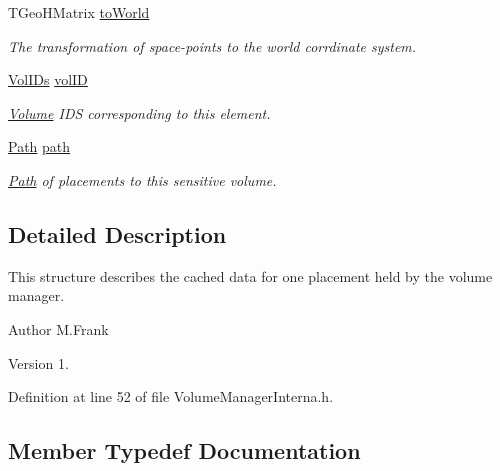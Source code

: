 \begin{DoxyCompactItemize}
T\+Geo\+H\+Matrix \hyperlink{class_d_d4hep_1_1_geometry_1_1_volume_manager_context_a724f7f6ffc6fc9e91dca0f07d5f14d1d}{to\+World}
\begin{DoxyCompactList}\small\item\em The transformation of space-\/points to the world corrdinate system. \end{DoxyCompactList}\item 
\hyperlink{class_d_d4hep_1_1_geometry_1_1_volume_manager_context_aedf28d4a226428cfc6ebaabaee0b4c9e}{Vol\+I\+Ds} \hyperlink{class_d_d4hep_1_1_geometry_1_1_volume_manager_context_a3982d4e94fc483caa54382e719eb568c}{vol\+ID}
\begin{DoxyCompactList}\small\item\em \hyperlink{class_d_d4hep_1_1_geometry_1_1_volume}{Volume} I\+DS corresponding to this element. \end{DoxyCompactList}\item 
\hyperlink{class_d_d4hep_1_1_geometry_1_1_volume_manager_context_a7873b42c6ad25a77d4d7e240286a934c}{Path} \hyperlink{class_d_d4hep_1_1_geometry_1_1_volume_manager_context_aa29bc3744ae4aff1e6a504c2b758a37c}{path}
\begin{DoxyCompactList}\small\item\em \hyperlink{class_d_d4hep_1_1_path}{Path} of placements to this sensitive volume. \end{DoxyCompactList}\end{DoxyCompactItemize}


\subsection{Detailed Description}
This structure describes the cached data for one placement held by the volume manager. 

\begin{DoxyAuthor}{Author}
M.\+Frank 
\end{DoxyAuthor}
\begin{DoxyVersion}{Version}
1. 
\end{DoxyVersion}


Definition at line 52 of file Volume\+Manager\+Interna.\+h.



\subsection{Member Typedef Documentation}
\hypertarget{class_d_d4hep_1_1_geometry_1_1_volume_manager_context_a7873b42c6ad25a77d4d7e240286a934c}{}\label{class_d_d4hep_1_1_geometry_1_1_volume_manager_context_a7873b42c6ad25a77d4d7e240286a934c} 
